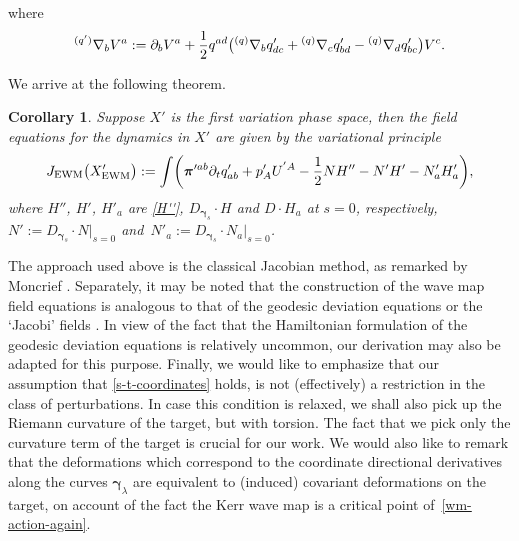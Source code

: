 \documentclass[11pt]{article}
\numberwithin{equation}{section}
\def\ptl{\partial}%
\def\mbo#1{\boldsymbol{#1}}%
\def\grad{{\nabla}}%
\newcommand{\leftexp}[2]{{\vphantom{#2}}^{#1}{#2}}
\def\halb{\frac{1}{2}}%
\numberwithin{equation}{section}
\newtheorem{Corollary}[Theorem]{Corollary}
\begin{document}
where
\[
\leftexp{(q')}{\grad}_b V^a := \ptl_b V^a+ \halb q^{ad} \bigl(\leftexp{(q)}{\grad}_b q'_{dc} + \leftexp{(q)}{\grad}_c q'_{bd} -\leftexp{(q)}{\grad}_d q'_{bc} \bigr) V^c.
\]

We arrive at the following theorem.

\begin{Corollary}\label{second-var}
Suppose $X'$ is the first variation phase space, then the field equations for the dynamics in $X'$ are given by the variational principle
\begin{align*}
J_{{\rm EWM}} \bigl(X'_{{\rm EWM}}\bigr) := \int \biggl(\mbo{\pi}'^{ab} \ptl_t q'_{ab} + p'_A U^{'A} - \halb N H'' - N' H' - N'_a H'_a \biggr),
\end{align*}
where $H''$, $H'$, $H'_a$ are \eqref{H''}, $D_{\mbo{\gamma}_s} \cdot H$ and $D \cdot H_a$ at $s=0$, respectively, $N' := D_{\mbo{\gamma}_s} \cdot N \big\vert_{s=0}$ and~${N'_a := D_{\mbo{\gamma}_s} \cdot N_a \big\vert_{s=0}}$.
\end{Corollary}

The approach used above is the classical Jacobian method, as remarked by Moncrief \cite{Moncrief_74}. Separately, it may be noted that the construction of the wave map field equations is analogous to that of the geodesic deviation equations or the `Jacobi' fields \cite{Misn_78, synge_34}. In view of the fact that the Hamiltonian formulation of the geodesic deviation equations is relatively uncommon, our derivation may also be adapted for this purpose. Finally, we would like to emphasize that our assumption that \eqref{s-t-coordinates} holds, is not (effectively) a restriction in the class of perturbations. In case this condition is relaxed, we shall also pick up the Riemann curvature of the target, but with torsion. The fact that we pick only the curvature term of the target is crucial for our work. We would also like to remark that the deformations which correspond to the coordinate directional derivatives along the curves $\mbo{\gamma}_\lambda$ are equivalent to (induced) covariant deformations on the target, on account of the fact the Kerr wave map is a critical point of~\eqref{wm-action-again}.
\end{document}
